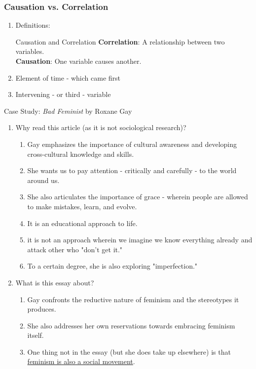 \documentclass[12pt,a4paper]{article}
\begin{document}
\subsubsection{Causation vs. Correlation}
\begin{enumerate}
	\item Definitions: 
	\begin{df}{Causation and Correlation}
		\textbf{Correlation}: A relationship between two variables.\\
		\textbf{Causation}: One variable causes another. 
	\end{df}
	\item Element of time - which came first
	\item Intervening - or third - variable
\end{enumerate}
\begin{eg}{Case Study: \textit{Bad Feminist} by Roxane Gay}
	\begin{enumerate}
		\item Why read this article (as it is not sociological research)? 
		\begin{enumerate}
			\item Gay emphasizes the importance of cultural awareness and developing cross-cultural knowledge and skills. 
			\item She wants us to pay attention - critically and carefully - to the world around us. 
			\item She also articulates the importance of grace - wherein people are allowed to make mistakes, learn, and evolve. 
			\item It is an educational approach to life. 
			\item it is not an approach wherein we imagine we know everything already and attack other who "don't get it."
			\item To a certain degree, she is also exploring "imperfection."
		\end{enumerate}
		\item What is this essay about? 
		\begin{enumerate}
			\item Gay confronts the reductive nature of feminism and the stereotypes it produces. 
			\item She also addresses her own reservations towards embracing feminism itself. 
			\item One thing not in the essay (but she does take up elsewhere) is that \underline{feminism is also a social movement}. 
		\end{enumerate}

\end{enumerate}
\end{eg}
\end{document}
